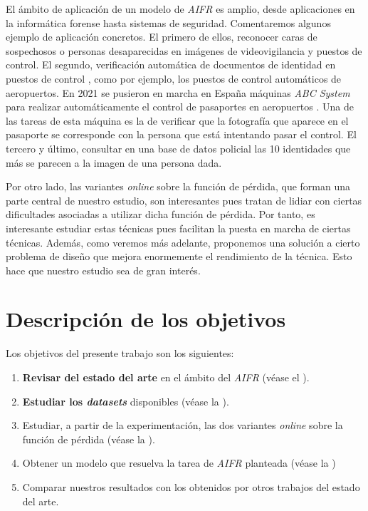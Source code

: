 El ámbito de aplicación de un modelo de \textit{AIFR} es amplio, desde aplicaciones en la informática forense \cite{informatica:libro_informatica_forense} hasta sistemas de seguridad. Comentaremos algunos ejemplo de aplicación concretos. El primero de ellos, reconocer caras de sospechosos o personas desaparecidas en imágenes de videovigilancia y puestos de control. El segundo, verificación automática de documentos de identidad en puestos de control \cite{informatica:tecnica_sintesis_aifr}, como por ejemplo, los puestos de control automáticos de aeropuertos. En 2021 se pusieron en marcha en España máquinas \textit{ABC System} para realizar automáticamente el control de pasaportes en aeropuertos \cite{informatica:articulo_abc_system}. Una de las tareas de esta máquina es la de verificar que la fotografía que aparece en el pasaporte se corresponde con la persona que está intentando pasar el control. El tercero y último, consultar en una base de datos policial las 10 identidades que más se parecen a la imagen de una persona dada.

Por otro lado, las variantes \textit{online} sobre la función de pérdida, que forman una parte central de nuestro estudio, son interesantes pues tratan de lidiar con ciertas dificultades asociadas a utilizar dicha función de pérdida. Por tanto, es interesante estudiar estas técnicas pues facilitan la puesta en marcha de ciertas técnicas. Además, como veremos más adelante, proponemos una solución a cierto problema de diseño que mejora enormemente el rendimiento de la técnica. Esto hace que nuestro estudio sea de gran interés.

\section{Descripción de los objetivos}

Los objetivos del presente trabajo son los siguientes:

\begin{enumerate}
	\item \textbf{Revisar del estado del arte} en el ámbito del \textit{AIFR} (véase el ).
	\item \textbf{Estudiar los \textit{datasets}} disponibles (véase la ).
	\item Estudiar, a partir de la experimentación, las dos variantes \textit{online} sobre la función de pérdida (véase la ).
	\item Obtener un modelo que resuelva la tarea de \textit{AIFR} planteada (véase la )
	\item Comparar nuestros resultados con los obtenidos por otros trabajos del estado del arte.
\end{enumerate}

